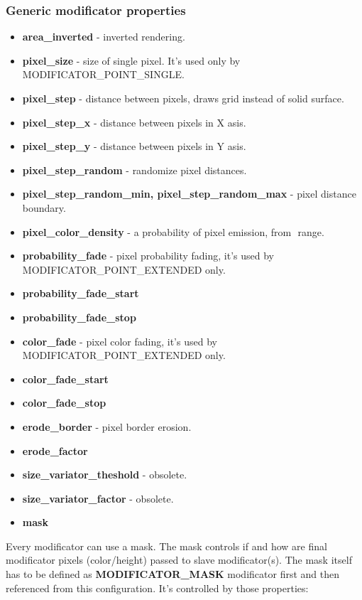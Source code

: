 \documentclass[9pt]{article}
\begin{document}
\subsubsection*{Generic modificator properties}
\begin{itemize}
\item{\bf area\_inverted} - inverted rendering.
\item{\bf pixel\_size} - size of single pixel. It's used only by MODIFICATOR\_POINT\_SINGLE.
\item{\bf pixel\_step} - distance between pixels, draws grid instead of solid surface.
\item{\bf pixel\_step\_x} - distance between pixels in X asis.
\item{\bf pixel\_step\_y} - distance between pixels in Y asis.
\item{\bf pixel\_step\_random} - randomize pixel distances.
\item{\bf pixel\_step\_random\_min, pixel\_step\_random\_max} - pixel distance boundary. 
\item{\bf pixel\_color\_density} - a probability of pixel emission, from
\begin{math}<0,1>\end{math} range.
\item{\bf probability\_fade} - pixel probability fading, it's used by MODIFICATOR\_POINT\_EXTENDED only.
\item{\bf probability\_fade\_start}
\item{\bf probability\_fade\_stop}
\item{\bf color\_fade} - pixel color fading, it's used by MODIFICATOR\_POINT\_EXTENDED only.
\item{\bf color\_fade\_start}
\item{\bf color\_fade\_stop}
\item{\bf erode\_border} - pixel border erosion.
\item{\bf erode\_factor}
\item{\bf size\_variator\_theshold} - obsolete.
\item{\bf size\_variator\_factor} - obsolete.
\item{\bf mask}
\end{itemize}
Every modificator can use a mask. The mask controls if and how are final
modificator pixels (color/height) passed to slave modificator(s). The mask itself 
has to be defined as {\bf MODIFICATOR\_MASK} modificator first and then referenced
from this configuration. It's controlled by those properties:
\end{document}
